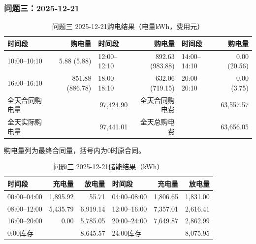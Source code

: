 \par\medskip
\par\noindent\begin{minipage}{\textwidth}
\subsubsection*{问题三：2025-12-21}
\begin{table}[H]\centering\small\setlength{\tabcolsep}{4pt}\caption{问题三 2025-12-21购电结果（电量kWh，费用元）}
\begin{tabular}{lr lr lr}\toprule
时间段 & 购电量 & 时间段 & 购电量 & 时间段 & 购电量\\\midrule
10:00--10:10 & 5.88 (5.88) & 12:00--12:10 & 892.63 (983.88) & 14:00--14:10 & 0.00 (20.56)\\
16:00--16:10 & 851.88 (886.78) & 18:00--18:10 & 632.06 (719.15) & 20:00--20:10 & 0.00 (3.75)\\
\midrule
全天合同购电量 & \multicolumn{2}{r}{97,424.90} & 全天合同购电费 & \multicolumn{2}{r}{63,557.57}\\
全天实际购电量 & \multicolumn{2}{r}{97,441.01} & 全天总购电费 & \multicolumn{2}{r}{63,656.05}\\
\bottomrule\end{tabular}\end{table}
\noindent\small 购电量列为最终合同量，括号内为0时原合同。\normalsize
\begin{table}[H]\centering\small\setlength{\tabcolsep}{4pt}\caption{问题三 2025-12-21储能结果（kWh）}
\begin{tabular}{lrr lrr}\toprule
时间段 & 充电量 & 放电量 & 时间段 & 充电量 & 放电量\\\midrule
00:00--04:00 & 1,895.92 & 55.71 & 04:00--08:00 & 1,806.65 & 1,831.00\\
08:00--12:00 & 5,435.79 & 6,919.14 & 12:00--16:00 & 7,357.01 & 2,616.41\\
16:00--20:00 & 0.00 & 5,785.05 & 20:00--24:00 & 7,649.87 & 2,862.99\\
\midrule
0:00库存 & \multicolumn{2}{r}{8,645.57} & 24:00库存 & \multicolumn{2}{r}{8,075.95}\\
\bottomrule\end{tabular}\end{table}
\end{minipage}\par
